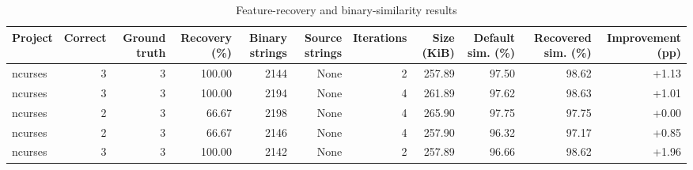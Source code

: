 \begin{table}[htbp]
\centering
\caption{Feature-recovery and binary-similarity results}
\label{tab:feature-recovery-results}
\small
\begin{tabular}{lrrrrrrrrrr}
\toprule
Project & Correct & Ground truth & Recovery (\%) & Binary strings & Source strings & Iterations & Size (KiB) & Default sim. (\%) & Recovered sim. (\%) & Improvement (pp) \\
\midrule
ncurses & 3 & 3 & 100.00 & 2144 & None & 2 & 257.89 & 97.50 & 98.62 & +1.13 \\
ncurses & 3 & 3 & 100.00 & 2194 & None & 4 & 261.89 & 97.62 & 98.63 & +1.01 \\
ncurses & 2 & 3 & 66.67 & 2198 & None & 4 & 265.90 & 97.75 & 97.75 & +0.00 \\
ncurses & 2 & 3 & 66.67 & 2146 & None & 4 & 257.90 & 96.32 & 97.17 & +0.85 \\
ncurses & 3 & 3 & 100.00 & 2142 & None & 2 & 257.89 & 96.66 & 98.62 & +1.96 \\
\bottomrule
\end{tabular}
\end{table}
